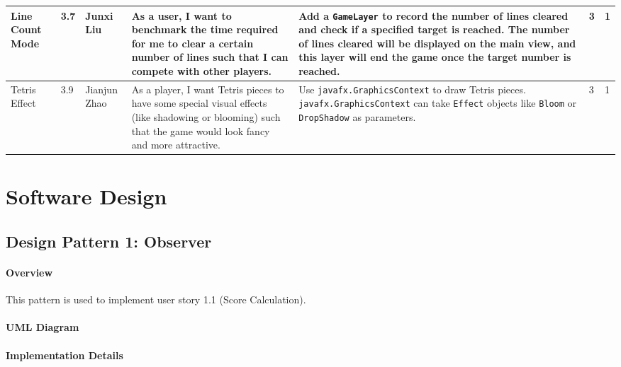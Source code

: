 \documentclass{article}
\begin{document}
\begin{xltabular}{\textwidth}{|p{2cm}|p{0.5cm}|p{1.5cm}|p{4cm}|p{4.7cm}|p{1.3cm}|p{1cm}|}
\hline Line Count Mode & 3.7 & Junxi Liu &
As a user, I want to benchmark the time required for me to clear a certain number of lines such that I can compete with other players.&
Add a \verb|GameLayer| to record the number of lines cleared and check if a specified target is reached. The number of lines cleared will be displayed on the main view, and this layer will end the game once the target number is reached. &
3 & 1 \\

\hline Tetris Effect & 3.9 & Jianjun Zhao &
As a player, I want Tetris pieces to have some special visual effects (like shadowing or blooming) such that the game would look fancy and more attractive. & Use \verb|javafx.GraphicsContext| to draw Tetris pieces. \verb|javafx.GraphicsContext| can take \verb|Effect| objects like \verb|Bloom| or \verb|DropShadow| as parameters.
&
3 & 1 \\
\hline
\end{xltabular}

\newpage

\section{Software Design}

\subsection{Design Pattern 1: Observer}

\paragraph{Overview}
This pattern is used to implement user story 1.1 (Score Calculation).

\paragraph{UML Diagram}\hfill

\begin{figure}[H]
    
\end{figure}

\paragraph{Implementation Details}
\end{document}
